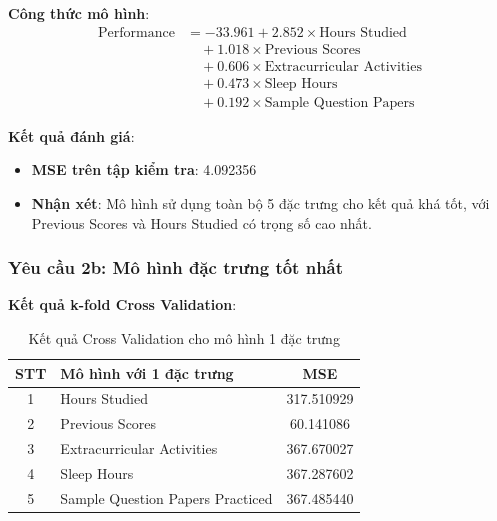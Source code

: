 \textbf{Công thức mô hình}:
\begin{align}
	\text{Performance} & = -33.961 + 2.852 \times \text{Hours Studied} \nonumber          \\
	                   & \quad + 1.018 \times \text{Previous Scores} \nonumber            \\
	                   & \quad + 0.606 \times \text{Extracurricular Activities} \nonumber \\
	                   & \quad + 0.473 \times \text{Sleep Hours} \nonumber                \\
	                   & \quad + 0.192 \times \text{Sample Question Papers}
\end{align}

\textbf{Kết quả đánh giá}:
\begin{itemize}
	\item \textbf{MSE trên tập kiểm tra}: 4.092356
	\item \textbf{Nhận xét}: Mô hình sử dụng toàn bộ 5 đặc trưng cho kết quả khá tốt, với Previous Scores và Hours Studied có trọng số cao nhất.
\end{itemize}

\subsubsection{Yêu cầu 2b: Mô hình đặc trưng tốt nhất}

\textbf{Kết quả k-fold Cross Validation}:

\begin{table}[H]
	\centering
	\begin{tabular}{|c|l|c|}
		\hline
		\textbf{STT} & \textbf{Mô hình với 1 đặc trưng} & \textbf{MSE} \\
		\hline
		1            & Hours Studied                    & 317.510929   \\
		\hline
		2            & Previous Scores                  & 60.141086    \\
		\hline
		3            & Extracurricular Activities       & 367.670027   \\
		\hline
		4            & Sleep Hours                      & 367.287602   \\
		\hline
		5            & Sample Question Papers Practiced & 367.485440   \\
		\hline
	\end{tabular}
	\caption{Kết quả Cross Validation cho mô hình 1 đặc trưng}
	\label{tab:single_feature}
\end{table}

